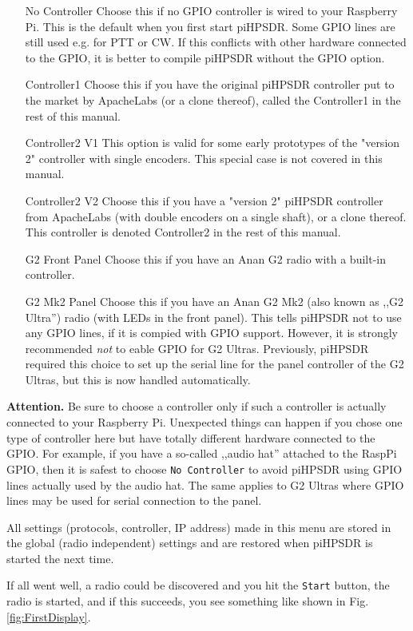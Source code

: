 \documentclass[12pt]{book}
\def\rett#1{\texttt{\color{red}#1}}
\def\pH{pi\-HPSDR\xspace}
\begin{document}
\begin{itemize}[font=\texttt, left=80pt]
\item[No Controller]{Choose this if no GPIO controller is wired to your Raspberry Pi. This is the default
when you first start \pH. Some GPIO lines are still used e.g. for PTT or CW. If this conflicts with other
hardware connected to the GPIO, it is better to compile \pH without the GPIO option.}
\item[Controller1]{Choose this if you have the original \pH controller put to the market by ApacheLabs
(or a clone thereof), called the Controller1 in the rest
of this manual.}
\item[Controller2 V1]{This option is valid for some early prototypes of the "version 2" controller with
single encoders. This special case is not covered in this manual.}
\item[Controller2 V2]{Choose this if you have a "version 2" \pH controller from ApacheLabs (with double encoders
on a single shaft), or a clone thereof.
This controller is denoted Controller2 in the rest of this manual.}
\item[G2 Front Panel]{Choose this if you have an Anan G2 radio with a built-in controller.}
\item[G2 Mk2 Panel]{Choose this if you have an Anan G2 Mk2 (also known as ,,G2 Ultra'')
radio (with LEDs in the front panel).
This tells \pH not to use any GPIO lines, if it is compied with GPIO support. However, it is
strongly recommended \textit{not} to eable GPIO for G2 Ultras. Previously, \pH required this choice
to set up the serial line for the panel controller of the G2 Ultras, but this is now handled
automatically.}
\end{itemize}

\textbf{Attention.} Be sure to choose a controller only if such a controller is actually connected to your
Raspberry Pi. Unexpected things can happen if you chose one type of controller here but have totally different
hardware connected to the GPIO. For example, if you have a so-called ,,audio hat'' attached to the RaspPi
GPIO, then it is safest to choose \texttt{No Controller} to avoid \pH using GPIO lines actually used
by the audio hat. The same applies to G2 Ultras where GPIO lines may be used for serial connection
to the panel.

All settings (protocols, controller, IP address) made in this menu are stored in the global (radio
independent) settings
and are restored when \pH is started the next time.

If all went well, a radio could be discovered and you hit the \rett{Start} button, the radio is started, and
if this succeeds, you see something like shown in Fig. \ref{fig:FirstDisplay}.
\end{document}
